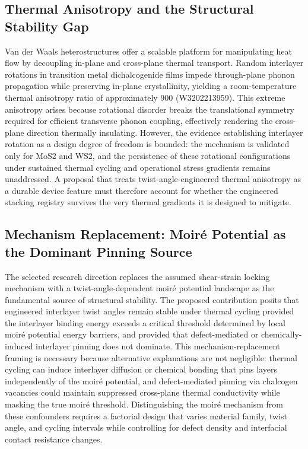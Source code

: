 \documentclass[conference]{IEEEtran}
\begin{document}
\subsection{Thermal Anisotropy and the Structural Stability Gap}
Van der Waals heterostructures offer a scalable platform for manipulating heat flow by decoupling in-plane and cross-plane thermal transport. Random interlayer rotations in transition metal dichalcogenide films impede through-plane phonon propagation while preserving in-plane crystallinity, yielding a room-temperature thermal anisotropy ratio of approximately 900 (W3202213959). This extreme anisotropy arises because rotational disorder breaks the translational symmetry required for efficient transverse phonon coupling, effectively rendering the cross-plane direction thermally insulating. However, the evidence establishing interlayer rotation as a design degree of freedom is bounded: the mechanism is validated only for MoS2 and WS2, and the persistence of these rotational configurations under sustained thermal cycling and operational stress gradients remains unaddressed. A proposal that treats twist-angle-engineered thermal anisotropy as a durable device feature must therefore account for whether the engineered stacking registry survives the very thermal gradients it is designed to mitigate.~\cite{cite_26ecaf73d88dfe33}

\subsection{Mechanism Replacement: Moiré Potential as the Dominant Pinning Source}
The selected research direction replaces the assumed shear-strain locking mechanism with a twist-angle-dependent moiré potential landscape as the fundamental source of structural stability. The proposed contribution posits that engineered interlayer twist angles remain stable under thermal cycling provided the interlayer binding energy exceeds a critical threshold determined by local moiré potential energy barriers, and provided that defect-mediated or chemically-induced interlayer pinning does not dominate. This mechanism-replacement framing is necessary because alternative explanations are not negligible: thermal cycling can induce interlayer diffusion or chemical bonding that pins layers independently of the moiré potential, and defect-mediated pinning via chalcogen vacancies could maintain suppressed cross-plane thermal conductivity while masking the true moiré threshold. Distinguishing the moiré mechanism from these confounders requires a factorial design that varies material family, twist angle, and cycling intervals while controlling for defect density and interfacial contact resistance changes.
\end{document}
